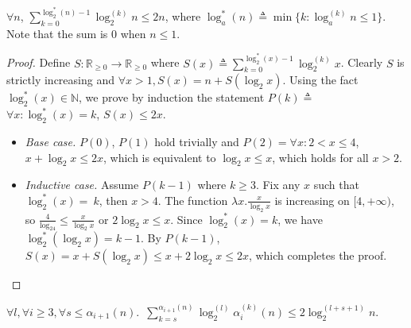 \begin{lem}
	$\forall n$, $\displaystyle \sum_{k = 0}^{\log_2^*(n) - 1}\log_2^{(k)}n \le 2n$, where $\log_a^*(n) \triangleq \min\{k : \log_a^{(k)}n \le 1\}$. Note that the sum is $0$ when $n\le 1$.
\end{lem}
\begin{proof}
	Define $S: \mathbb{R}_{\ge 0}\to \mathbb{R}_{\ge 0}$ where $S(x) \triangleq \sum_{k = 0}^{\log_2^*(x) - 1}\log_2^{(k)}x$. Clearly $S$ is strictly increasing and $\forall x>1, S(x) = n + S(\log_2 x)$. Using the fact $\log_2^*(x)\in \mathbb{N}$, we prove by induction the statement $P(k) \triangleq$ $\forall x: \log_2^*(x) = k$, $S(x)\le 2x$.
	\begin{itemize}[leftmargin=*]
		\item \emph{Base case.} $P(0)$, $P(1)$ hold trivially and $P(2) = \forall x: 2 < x \le 4$, \linebreak $x + \log_2x \le 2x$, which is equivalent to $\log_2x \le x$, which holds for all $x > 2$.
		
		\item \emph{Inductive case.} Assume $P(k-1)$ where $k\ge 3$. Fix any $x$ such that $\log_2^*(x)=~k$, then $x > 4$. The function $\lambda x.\frac{x}{\log_2x}$ is increasing on $[4, +\infty)$, so $\frac{4}{\log_24} \le \frac{x}{\log_2x}$ or $2\log_2x \le x$. Since $\log_2^*(x) = k$, we have $\log_2^*(\log_2x) = k-1$. By $P(k-1)$, $S(x) = x + S(\log_2x) \le x + 2\log_2x \le 2x$, which completes the proof.
	\end{itemize}
\end{proof}
\begin{lem} \label{lem: sum-alpha-repeat}
	$\forall l, \forall i \ge 3, \forall s\le \alpha_{i+1}(n)$.~$\displaystyle \sum_{k=s}^{\alpha_{i+1}(n)} \log_2^{(l)}\alpha_i^{(k)}(n) \le 2\log_2^{(l+s+1)}n$.
\end{lem}
